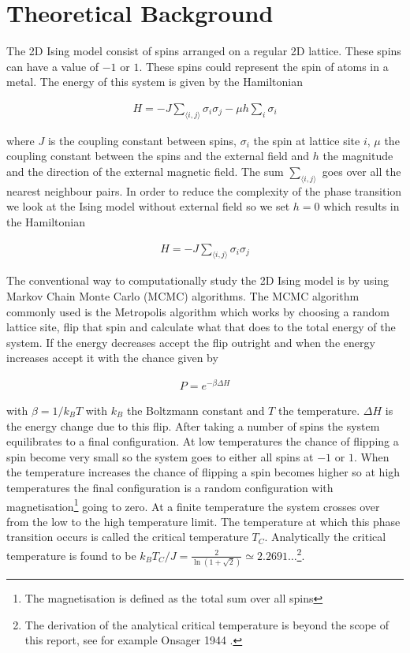 \documentclass[10 pt, a4paper]{article}
\begin{document}
\section{Theoretical Background}

The 2D Ising model consist of spins arranged on a regular 2D lattice. These spins can have a value of $-1$ or $1$. These spins could represent the spin of atoms in a metal. The energy of this system is given by the Hamiltonian 

\begin{align}
H = -J  \sum_{\langle i,j \rangle} \sigma_i \sigma_j -  \mu h \sum_i \sigma_i
\end{align}          

where $J$ is the coupling constant between spins, $\sigma_i$ the spin at lattice site $i$, $\mu$ the coupling constant between the spins and the external field and $h$ the magnitude and the direction of the external magnetic field. The sum $\sum_{\langle i,j \rangle}$ goes over all the nearest neighbour pairs. In order to reduce the complexity of the phase transition we look at the Ising model without external field so we set $h = 0$ which results in the Hamiltonian

\begin{align}
H = -J  \sum_{\langle i,j \rangle} \sigma_i \sigma_j 
\end{align} 

The conventional way to computationally study the 2D Ising model is by using Markov Chain Monte Carlo (MCMC) algorithms. The MCMC algorithm commonly used is the Metropolis algorithm which works by choosing a random lattice site, flip that spin and calculate what that does to the total energy of the system. If the energy decreases accept the flip outright and when the energy increases accept it with the chance given by

\begin{align}
P = e^{- \beta \Delta H}
\end{align}

with $\beta = 1/k_B T$ with $k_B$ the Boltzmann constant and $T$ the temperature. $\Delta H$ is the energy change due to this flip. After taking a number of spins the system equilibrates to a final configuration. At low temperatures the chance of flipping a spin become very small so the system goes to either all spins at $-1$ or $1$. When the temperature increases the chance of flipping a spin becomes higher so at high temperatures the final configuration is a random configuration with magnetisation\footnote{The magnetisation is defined as the total sum over all spins} going to zero. At a finite temperature the system crosses over from the low to the high temperature limit. The temperature at which this phase transition occurs is called the critical temperature $T_C$. Analytically the critical temperature is found to be $k_B T_C / J = \frac{2}{\ln(1 + \sqrt{2})} \simeq 2.2691 \dots $\footnote{The derivation of the analytical critical temperature is beyond the scope of this report, see for example Onsager 1944 \cite{onsager}.}.
\end{document}
